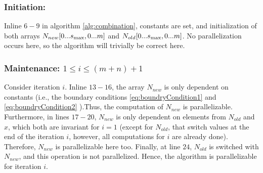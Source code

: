 \documentclass[a4paper]{article}
\begin{document}
\subsubsection{Initiation:}
\label{subsubsec:v2}
Inline $6-9$ in algorithm \ref{alg:combination}, constants are set, and initialization of both arrays $N_{new}[0...s_{\rm max},0...m]$ and $N_{old}[0...s_{\rm max},0...m]$. No parallelization occurs here, so the algorithm will trivially be correct here.

\subsubsection{Maintenance: $1\leq i \leq (m+n)+1$}
\label{subsubsec:maintenance}
Consider iteration $i$. Inline $13-16$, the array $N_{new}$ is only dependent on constants (i.e., the boundary conditions \ref{eq:boundryCondition1} and \ref{eq:boundryCondition2} ).Thus, the computation of $N_{new}$ is parallelizable. Furthermore, in lines $17-20$, $N_{new}$ is only dependent on elements from $N_{old}$ and $x$, which both are invariant for $i=1$ (except for $N_{old}$, that switch values at the end of the iteration $i$, however, all computations for $i$ are already done). Therefore, $N_{new}$ is parallelizable here too. Finally, at line $24$, $N_{old}$ is switched with $N_{new}$, and this operation is not parallelized. Hence, the algorithm is parallelizable for iteration $i$.
\end{document}
